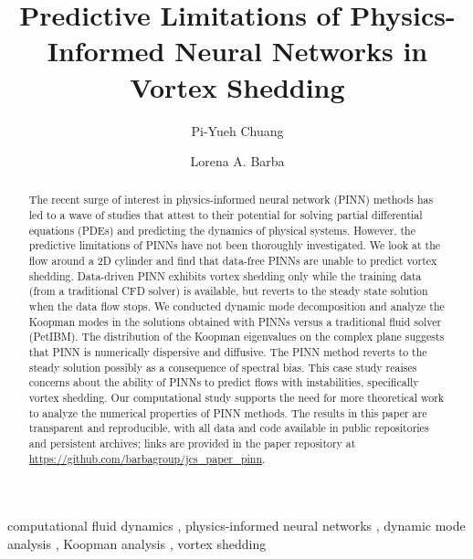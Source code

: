 \documentclass[5p, twocolumn, times, sort&compress]{elsarticle}
\begin{document}
    \begin{frontmatter}
        \title{%
        Predictive Limitations of Physics-Informed Neural Networks in Vortex Shedding%
        }

        \author[1]{Pi-Yueh Chuang}
        \author[1]{Lorena A. Barba}

        \begin{abstract}
            The recent surge of interest in physics-informed neural network (PINN) methods has led to a wave of studies that attest to their potential for solving partial differential equations (PDEs) and predicting the dynamics of physical systems. However, the predictive limitations of PINNs have not been thoroughly investigated. We look at the flow around a 2D cylinder and find that data-free PINNs are unable to predict vortex shedding. Data-driven PINN exhibits vortex shedding only while the training data (from a traditional CFD solver) is available, but reverts to the steady state solution when the data flow stops. We conducted dynamic mode decomposition and analyze the Koopman modes in the solutions obtained with PINNs versus a traditional fluid solver (PetIBM). The distribution of the Koopman eigenvalues on the complex plane suggests that PINN is numerically dispersive and diffusive. The PINN method  reverts to the steady solution possibly as a consequence of spectral bias. This case study reaises concerns about the ability of PINNs to predict flows with instabilities, specifically vortex shedding. Our computational study supports the need for more theoretical work to analyze the numerical properties of PINN methods. The results in this paper are transparent and reproducible, with all data and code available in public repositories and persistent archives; links are provided in the paper repository at \url{https://github.com/barbagroup/jcs_paper_pinn}.
        \end{abstract}

        \begin{keyword}
            computational fluid dynamics \sep
            physics-informed neural networks \sep
            dynamic mode analysis \sep
            Koopman analysis \sep
            vortex shedding
        \end{keyword}
    \end{frontmatter}
\end{document}
